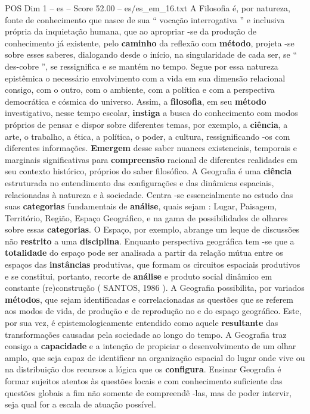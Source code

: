\begin{textsample}{POS Dim 1 – es – Score 52.00 – es/es\_em\_16.txt}
A Filosofia é, por natureza, fonte de conhecimento que nasce de sua “ vocação interrogativa ” e inclusiva própria da inquietação humana, que ao apropriar -se da produção de conhecimento já existente, pelo \textbf{caminho} da reflexão com \textbf{método}, projeta -se sobre esses saberes, dialogando desde o início, na singularidade de cada ser, se “ des-cobre ”, se ressignifica e se mantém no tempo.
Segue por essa natureza epistêmica o necessário envolvimento com a vida em sua dimensão relacional consigo, com o outro, com o ambiente, com a política e com a perspectiva democrática e cósmica do universo.
Assim, a \textbf{filosofia}, em seu \textbf{método} investigativo, nesse tempo escolar, \textbf{instiga} a busca do conhecimento com modos próprios de pensar e dispor sobre diferentes temas, por exemplo, a \textbf{ciência}, a arte, o trabalho, a ética, a política, o poder, a cultura, ressignificando -os com diferentes informações. \textbf{Emergem} desse saber nuances existenciais, temporais e marginais significativas para \textbf{compreensão} racional de diferentes realidades em seu contexto histórico, próprios do saber filosófico.
A Geografia é uma \textbf{ciência} estruturada no entendimento das configurações e das dinâmicas espaciais, relacionadas à natureza e à sociedade.
Centra -se essencialmente no estudo das suas \textbf{categorias} fundamentais de \textbf{análise}, quais sejam : Lugar, Paisagem, Território, Região, Espaço Geográfico, e na gama de possibilidades de olhares sobre essas \textbf{categorias}.
O Espaço, por exemplo, abrange um leque de discussões não \textbf{restrito} a uma \textbf{disciplina}.
Enquanto perspectiva geográfica tem -se que a \textbf{totalidade} do espaço pode ser analisada a partir da relação mútua entre os espaços das \textbf{instâncias} produtivas, que formam os circuitos espaciais produtivos e se constitui, portanto, recorte de \textbf{análise} e produto social dinâmico em constante (re)construção ( SANTOS, 1986 ).
A Geografia possibilita, por variados \textbf{métodos}, que sejam identificadas e correlacionadas as questões que se referem aos modos de vida, de produção e de reprodução no e do espaço geográfico.
Este, por sua vez, é epistemologicamente entendido como aquele \textbf{resultante} das transformações causadas pela sociedade ao longo do tempo.
A Geografia traz consigo a \textbf{capacidade} e a intenção de propiciar o desenvolvimento de um olhar amplo, que seja capaz de identificar na organização espacial do lugar onde vive ou na distribuição dos recursos a lógica que os \textbf{configura}.
Ensinar Geografia é formar sujeitos atentos às questões locais e com conhecimento suficiente das questões globais a fim não somente de compreendê -las, mas de poder intervir, seja qual for a escala de atuação possível.

\end{textsample}
